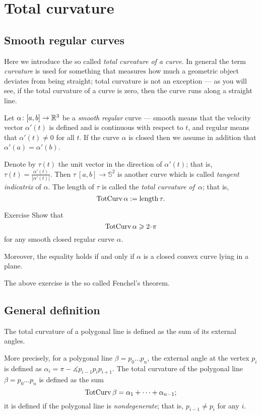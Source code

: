 \chapter{Total curvature}

\section{Smooth regular curves}\label{sec:total-curvature-smooth}

Here we introduce the so called \emph{total curvature of a curve}.
In general the term \emph{curvature} is used for something that measures how much 
a geometric object deviates from being straight;
total curvature is not an exception --- as you will see, if the total curvature of a curve is zero, then the curve runs along a straight line.


Let $\alpha\colon[a,b]\to\mathbb{R}^3$ be a \emph{smooth} \emph{regular} curve --- smooth means that
the velocity vector $\alpha'(t)$ is defined and is continuous with respect to $t$, and regular means that $\alpha'(t)\ne 0$ for all $t$.
If the curve $\alpha$ is closed then we assume in addition that $\alpha'(a)=\alpha'(b)$.

Denote by $\tau(t)$ the unit vector in the direction of $\alpha'(t)$;
that is, $\tau(t)=\tfrac{\alpha'(t)}{|\alpha'(t)|}$.
Then $\tau\:[a,b]\to\mathbb{S}^2$ is another curve which is called \emph{tangent indicatrix} of $\alpha$.
The length of $\tau$ is called the \emph{total curvature of}~$\alpha$;
that is,
\[\mathop{\rm TotCurv}\nolimits\alpha:=\mathop{\rm length}\nolimits\tau.\]

\begin{thm}{Exercise}\label{ex:fenchel}
Show that 
\[\tc\alpha\ge 2\cdot \pi\]
for any smooth closed regular curve $\alpha$.

Moreover, the equality holds if and only if $\alpha$ is a closed convex curve lying in a plane.
\end{thm}

The above exercise is the so called Fenchel's theorem.


\section{General definition}

The total curvature of a polygonal line is defined as the sum of its external angles.

More precisely, 
for a polygonal line $\beta=p_0\dots p_n$,
the external angle at the vertex $p_i$ is defined as $\alpha_i=\pi-\measuredangle p_{i-1}p_ip_{i+1}$.
The total curvature of the polygonal line $\beta=p_0\dots p_n$ is defined as the sum
\[\mathop{\rm TotCurv}\nolimits\beta=\alpha_1+\dots+\alpha_{n-1};\]
it is defined if the polygonal line is \emph{nondegenerate}; that is, $p_{i-1}\ne p_i$ for any $i$.

